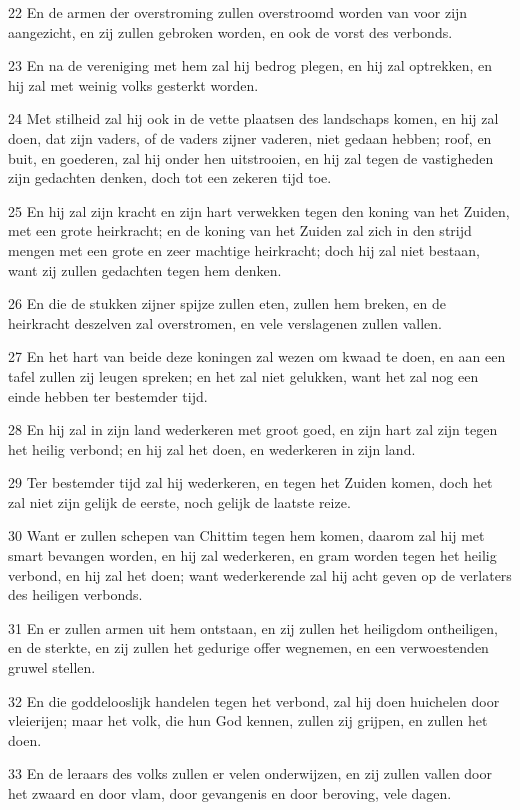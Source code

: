 \par 22 En de armen der overstroming zullen overstroomd worden van voor zijn aangezicht, en zij zullen gebroken worden, en ook de vorst des verbonds.
\par 23 En na de vereniging met hem zal hij bedrog plegen, en hij zal optrekken, en hij zal met weinig volks gesterkt worden.
\par 24 Met stilheid zal hij ook in de vette plaatsen des landschaps komen, en hij zal doen, dat zijn vaders, of de vaders zijner vaderen, niet gedaan hebben; roof, en buit, en goederen, zal hij onder hen uitstrooien, en hij zal tegen de vastigheden zijn gedachten denken, doch tot een zekeren tijd toe.
\par 25 En hij zal zijn kracht en zijn hart verwekken tegen den koning van het Zuiden, met een grote heirkracht; en de koning van het Zuiden zal zich in den strijd mengen met een grote en zeer machtige heirkracht; doch hij zal niet bestaan, want zij zullen gedachten tegen hem denken.
\par 26 En die de stukken zijner spijze zullen eten, zullen hem breken, en de heirkracht deszelven zal overstromen, en vele verslagenen zullen vallen.
\par 27 En het hart van beide deze koningen zal wezen om kwaad te doen, en aan een tafel zullen zij leugen spreken; en het zal niet gelukken, want het zal nog een einde hebben ter bestemder tijd.
\par 28 En hij zal in zijn land wederkeren met groot goed, en zijn hart zal zijn tegen het heilig verbond; en hij zal het doen, en wederkeren in zijn land.
\par 29 Ter bestemder tijd zal hij wederkeren, en tegen het Zuiden komen, doch het zal niet zijn gelijk de eerste, noch gelijk de laatste reize.
\par 30 Want er zullen schepen van Chittim tegen hem komen, daarom zal hij met smart bevangen worden, en hij zal wederkeren, en gram worden tegen het heilig verbond, en hij zal het doen; want wederkerende zal hij acht geven op de verlaters des heiligen verbonds.
\par 31 En er zullen armen uit hem ontstaan, en zij zullen het heiligdom ontheiligen, en de sterkte, en zij zullen het gedurige offer wegnemen, en een verwoestenden gruwel stellen.
\par 32 En die goddelooslijk handelen tegen het verbond, zal hij doen huichelen door vleierijen; maar het volk, die hun God kennen, zullen zij grijpen, en zullen het doen.
\par 33 En de leraars des volks zullen er velen onderwijzen, en zij zullen vallen door het zwaard en door vlam, door gevangenis en door beroving, vele dagen.
